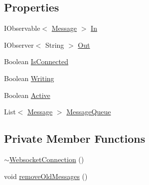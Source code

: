 \subsection*{Properties}
\begin{DoxyCompactItemize}
\item 
I\+Observable$<$ \hyperlink{class_web_analyzer_1_1_models_1_1_message_model_1_1_message}{Message} $>$ \hyperlink{class_web_analyzer_1_1_server_1_1_websocket_connection_aaff532a55d94eaddd75a2619da307c6a}{In}
\item 
I\+Observer$<$ String $>$ \hyperlink{class_web_analyzer_1_1_server_1_1_websocket_connection_a1f0be7b1ff80c5b742204d0883157578}{Out}
\item 
Boolean \hyperlink{class_web_analyzer_1_1_server_1_1_websocket_connection_a54d71b7e50589c027fff5441dea6ca54}{Is\+Connected}
\item 
Boolean \hyperlink{class_web_analyzer_1_1_server_1_1_websocket_connection_a973edb4f0e5e1644f551bf132ae77183}{Writing}
\item 
Boolean \hyperlink{class_web_analyzer_1_1_server_1_1_websocket_connection_af64b83d9aec7d436a262f732e3b03e0b}{Active}
\item 
List$<$ \hyperlink{class_web_analyzer_1_1_models_1_1_message_model_1_1_message}{Message} $>$ \hyperlink{class_web_analyzer_1_1_server_1_1_websocket_connection_a0351f67ba0d69e6d5701ef34395e0a59}{Message\+Queue}
\end{DoxyCompactItemize}
\subsection*{Private Member Functions}
\begin{DoxyCompactItemize}
\item 
\hyperlink{class_web_analyzer_1_1_server_1_1_websocket_connection_a734b1ec862ae9693901fa28b99c03922}{$\sim$\+Websocket\+Connection} ()
\item 
void \hyperlink{class_web_analyzer_1_1_server_1_1_websocket_connection_ab856bbd336338d41ea2196df96a39521}{remove\+Old\+Messages} ()
\end{DoxyCompactItemize}
